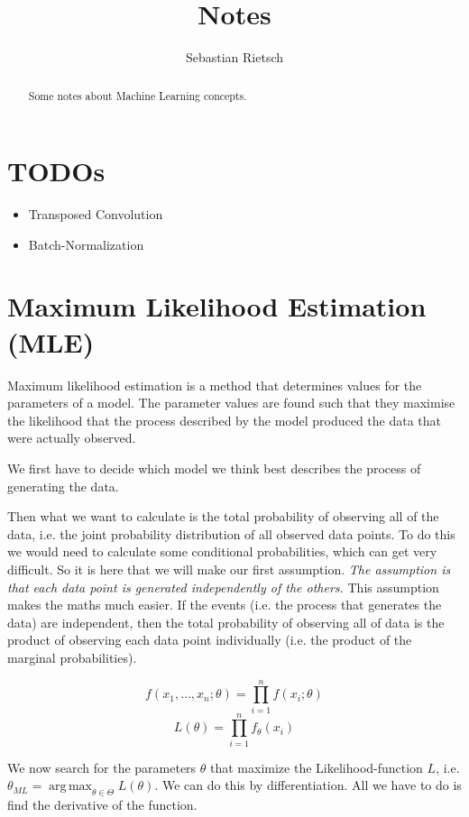 \documentclass{scrartcl}
\DeclareMathOperator*{\argmax}{arg\,max}
\begin{document}
\title{Notes}
\author{Sebastian Rietsch}

\maketitle
\begin{abstract}
Some notes about Machine Learning concepts.
\end{abstract}
\tableofcontents 
\newpage

\section{TODOs}
\begin{itemize}
	\item
		Transposed Convolution
	\item
		Batch-Normalization
\end{itemize}

\section[Maximum Likelihood Estimation (MLE)]{Maximum Likelihood Estimation (MLE)\cite{mle-wikipedia} \cite{mle-tds}}
Maximum likelihood estimation is a method that determines values for the parameters of a model. The parameter values are found such that they maximise the likelihood that the process described by the model produced the data that were actually observed.

We first have to decide which model we think best describes the process of generating the data.

Then what we want to calculate is the total probability of observing all of the data, i.e. the joint probability distribution of all observed data points. To do this we would need to calculate some conditional probabilities, which can get very difficult. So it is here that we will make our first assumption. \textit{The assumption is that each data point is generated independently of the others.} This assumption makes the maths much easier. If the events (i.e. the process that generates the data) are independent, then the total probability of observing all of data is the product of observing each data point individually (i.e. the product of the marginal probabilities).

$$f(x_1, \dots, x_n; \theta) = \prod_{i=1}^n f(x_i; \theta)$$
$$L(\theta) = \prod_{i=1}^n f_{\theta}(x_i)$$

We now search for the parameters $\theta$ that maximize the Likelihood-function $L$, i.e. $\theta_{ML} = \argmax_{\theta \in \Theta} L(\theta)$. We can do this by differentiation. All we have to do is find the derivative of the function.
\end{document}
